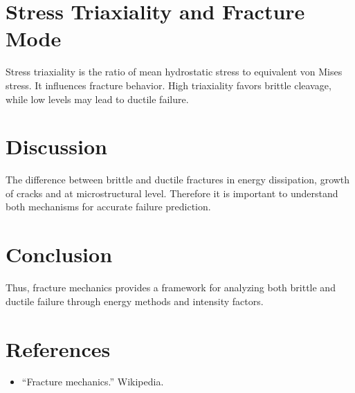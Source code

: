 \documentclass[12pt,a4paper]{article}
\begin{document}
\section{Stress Triaxiality and Fracture Mode}
Stress triaxiality is the ratio of mean hydrostatic stress to equivalent von Mises stress. It influences fracture behavior. High triaxiality favors brittle cleavage, while low levels may lead to ductile failure.

\section{Discussion}
The difference between brittle and ductile fractures in energy dissipation, growth of cracks and at microstructural level. Therefore it is important to understand both mechanisms for accurate failure prediction. 

\section{Conclusion}
Thus, fracture mechanics provides a framework for analyzing both brittle and ductile failure through energy methods and intensity factors. 

\section*{References}
\begin{itemize}
  \item “Fracture mechanics.” Wikipedia. 
  
\end{itemize}
\end{document}

